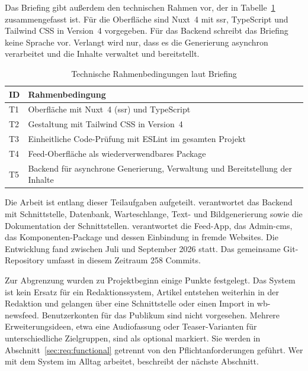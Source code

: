 Das Briefing gibt außerdem den technischen Rahmen vor, der in Tabelle~\ref{tab:req:tech} zusammengefasst ist.
Für die Oberfläche sind Nuxt~4 mit \gls{ssr}, TypeScript und Tailwind CSS in Version~4 vorgegeben.
Für das Backend schreibt das Briefing keine Sprache vor.
Verlangt wird nur, dass es die Generierung asynchron verarbeitet und die Inhalte verwaltet und bereitstellt.

\begin{table}
    \centering
    \small
    \begin{tabularx}{\textwidth}{l >{\raggedright\arraybackslash}X}
        \toprule
        \textbf{ID} & \textbf{Rahmenbedingung} \\
        \midrule
        T1 & Oberfläche mit Nuxt~4 (\gls{ssr}) und TypeScript \\
        T2 & Gestaltung mit Tailwind CSS in Version~4 \\
        T3 & Einheitliche Code-Prüfung mit ESLint im gesamten Projekt \\
        T4 & Feed-Oberfläche als wiederverwendbares Package \\
        T5 & Backend für asynchrone Generierung, Verwaltung und Bereitstellung der Inhalte \\
        \bottomrule
    \end{tabularx}
    \caption{Technische Rahmenbedingungen laut Briefing}
    \label{tab:req:tech}
\end{table}

Die Arbeit ist entlang dieser Teilaufgaben aufgeteilt.
\firstauthor{} verantwortet das Backend mit Schnittstelle, Datenbank, Warteschlange, Text- und Bildgenerierung sowie die Dokumentation der Schnittstellen.
\secondauthor{} verantwortet die Feed-App, das Admin-\gls{cms}, das Komponenten-Package und dessen Einbindung in fremde Websites.
Die Entwicklung fand zwischen Juli und September 2026 statt.
Das gemeinsame Git-Repository umfasst in diesem Zeitraum 258 Commits.

Zur Abgrenzung wurden zu Projektbeginn einige Punkte festgelegt.
Das System ist kein Ersatz für ein Redaktionssystem, Artikel entstehen weiterhin in der Redaktion und gelangen über eine Schnittstelle oder einen Import in wb-newsfeed.
Benutzerkonten für das Publikum sind nicht vorgesehen.
Mehrere Erweiterungsideen, etwa eine Audiofassung oder Teaser-Varianten für unterschiedliche Zielgruppen, sind als optional markiert.
Sie werden in Abschnitt~\ref{sec:req:functional} getrennt von den Pflichtanforderungen geführt.
Wer mit dem System im Alltag arbeitet, beschreibt der nächste Abschnitt.

